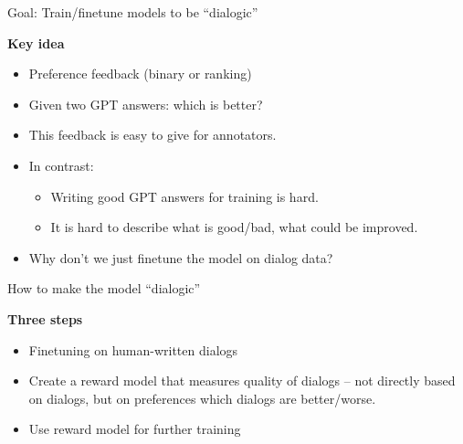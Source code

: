 \begin{vbframe}{Goal: Train/finetune models to be ``dialogic''}

\vfill

\textbf{Key idea}

	\begin{itemize}
		\item Preference feedback (binary or
                  ranking)
                  \item Given two GPT answers: which is
                    better?
                    \item This feedback is easy to give for
                      annotators.
                      \item In contrast:
	\begin{itemize}
                    \item Writing good GPT answers for
                      training is hard.
                    \item It is hard to describe what is good/bad,
                      what could be improved.
	\end{itemize}
		\item \ques Why don't we just finetune the model
		on dialog data?
	\end{itemize}

\vfill

\end{vbframe}


\begin{vbframe}{How to make the model ``dialogic''}

\vfill

\textbf{Three steps}

	\begin{itemize}
		\item Finetuning on human-written dialogs
                \item Create a reward model that measures
		quality of dialogs -- not directly based on dialogs,
		but on preferences which dialogs are
		better/worse.
                \item Use reward model for further training
	\end{itemize}

\vfill

\end{vbframe}



